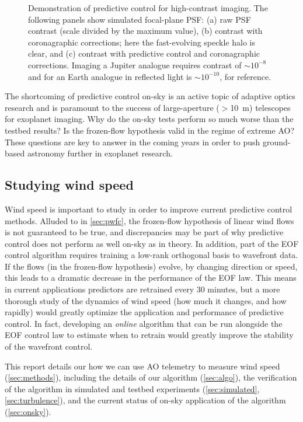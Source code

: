 \begin{figure}
    \centering
    \caption{Demonstration of predictive control for high-contrast imaging. The following panels show simulated focal-plane PSF: (a) raw PSF contrast (scale divided by the maximum value), (b) contrast with coronagraphic corrections; here the fast-evolving speckle halo is clear, and (c) contrast with predictive control and coronagraphic corrections. Imaging a Jupiter analogue requires contrast of $\sim10^{-8}$ and for an Earth analogue in reflected light is $\sim10^{-10}$, for reference.}
    \label{fig:eof-perf}
\end{figure}

The shortcoming of predictive control on-sky is an active topic of adaptive optics research \citep{2018ARA&A..56..315G} and is paramount to the success of large-aperture ($>$\SI{10}{\meter}) telescopes for exoplanet imaging. Why do the on-sky tests perform so much worse than the testbed results? Is the frozen-flow hypothesis valid in the regime of extreme AO? These questions are key to answer in the coming years in order to push ground-based astronomy further in exoplanet research.

\subsection{Studying wind speed} \label{sec:windspeed}

Wind speed is important to study in order to improve current predictive control methods. Alluded to in \autoref{sec:pwfc}, the frozen-flow hypothesis of linear wind flows is not guaranteed to be true, and discrepancies may be part of why predictive control does not perform as well on-sky as in theory. In addition, part of the EOF control algorithm requires training a low-rank orthogonal basis to wavefront data. If the flows (in the frozen-flow hypothesis) evolve, by changing direction or speed, this leads to a dramatic decrease in the performance of the EOF law. This means in current applications predictors are retrained every 30 minutes, but a more thorough study of the dynamics of wind speed (how much it changes, and how rapidly) would greatly optimize the application and performance of predictive control. In fact, developing an \textit{online} algorithm that can be run alongside the EOF control law to estimate when to retrain would greatly improve the stability of the wavefront control.

This report details our how we can use AO telemetry to measure wind speed (\autoref{sec:methods}), including the details of our algorithm (\autoref{sec:algo}), the verification of the algorithm in simulated and testbed experiments (\autoref{sec:simulated}, \autoref{sec:turbulence}), and the current status of on-sky application of the algorithm (\autoref{sec:onsky}).